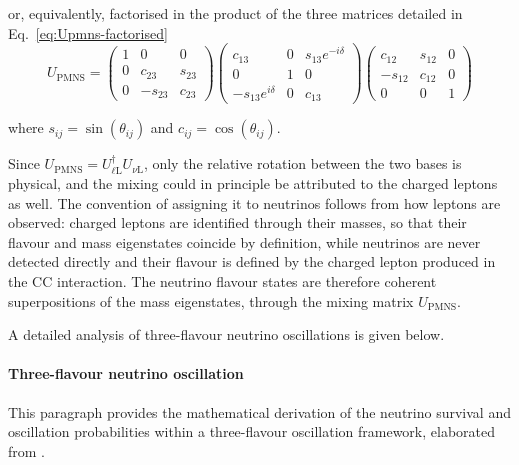 or, equivalently, factorised in the product of the three matrices detailed in Eq.~\ref{eq:Upmns-factorised}
\begin{equation}
    \label{eq:Upmns-factorised}
    U_{\text{PMNS}} = 
    \begin{pmatrix}
    1 & 0 & 0 \\
    0 & c_{23} & s_{23} \\
    0 & -s_{23} & c_{23}
    \end{pmatrix}
    \begin{pmatrix}
    c_{13} & 0 & s_{13}e^{-i\delta} \\
    0 & 1 & 0 \\
    -s_{13}e^{i\delta} & 0 & c_{13}
    \end{pmatrix}
    \begin{pmatrix}
    c_{12} & s_{12} & 0 \\
    -s_{12} & c_{12} & 0 \\
    0 & 0 & 1
    \end{pmatrix}
\end{equation}

where $s_{ij} = \sin(\theta_{ij})$ and $c_{ij} = \cos(\theta_{ij})$.

Since $U_\text{PMNS} = U_{\ell\text{L}}^\dagger U_{\nu\text{L}}$, only the relative rotation between the two bases is physical, and the mixing could in principle be attributed to the charged leptons as well. The convention of assigning it to neutrinos follows from how leptons are observed: charged leptons are identified through their masses, so that their flavour and mass eigenstates coincide by definition, while neutrinos are never detected directly and their flavour is defined by the charged lepton produced in the \ac{CC} interaction. The neutrino flavour states are therefore coherent superpositions of the mass eigenstates, through the mixing matrix $U_\text{PMNS}$.

A detailed analysis of three-flavour neutrino oscillations is given below.

\paragraph{Three-flavour neutrino oscillation}
\label{par:ThreeFlavoursOscillation}
This paragraph provides the mathematical derivation of the neutrino survival and oscillation probabilities within a three-flavour oscillation framework, elaborated from \cite{Brugnera}.

